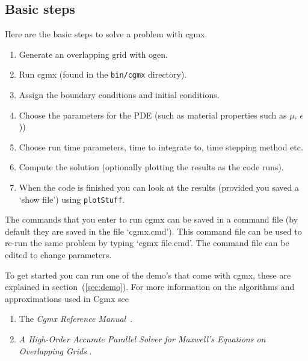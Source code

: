 \documentclass{article}
\newcommand{\Index}[1]{#1\index{#1}}
\newcommand{\obFigures}{\homeHenshaw/res/OverBlown/docFigures}  %
\begin{document}
\subsection{Basic steps}
Here are the basic steps to solve a problem with cgmx.
\begin{enumerate}
  \item Generate an overlapping grid with ogen. 
  \item Run cgmx (found in the {\tt bin/cgmx} directory).
  \item Assign the boundary conditions and initial conditions.
  \item Choose the parameters for the PDE (such as material properties such as $\mu$, $\epsilon$))
  \item Choose run time parameters, time to integrate to, time stepping method etc.
  \item Compute the solution (optionally plotting the results as the code runs).
  \item When the code is finished you can look at the results (provided you saved a
     `show file') using {\tt plotStuff}.
\end{enumerate}
The commands that you enter to run cgmx can be saved in a \Index{command file} (by default
they are saved in the file `cgmx.cmd'). This command file can be used to re-run
the same problem by typing `cgmx file.cmd'. The command file can be edited to change parameters.

To get started you can run one of the demo's that come with cgmx, these are 
explained in section~(\ref{sec:demo}).
% 
For more information on the algorithms and approximations used in Cgmx see
\begin{enumerate}
  \item The {\sl Cgmx Reference Manual}~\cite{CgmxReferenceManual}.
  \item {\sl A High-Order Accurate Parallel Solver for {Maxwell}'s Equations on Overlapping Grids}
        \cite{max2006b}.
\end{enumerate}

  
\end{document}
